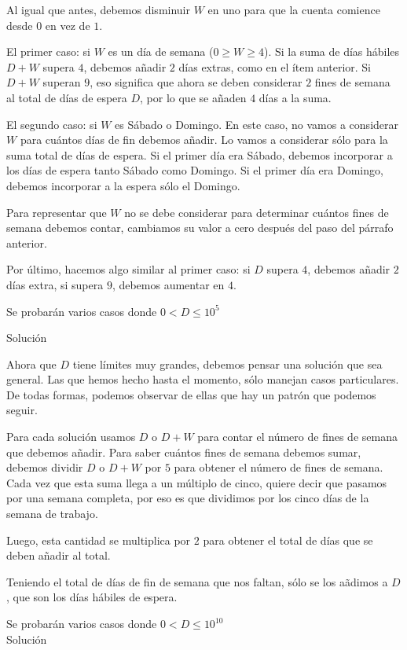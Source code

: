 \documentclass{oci}
\begin{document}
\begin{scoreDescription}
  Al igual que antes, debemos disminuir $W$ en uno para que la cuenta comience desde $0$
  en vez de $1$.

  El primer caso: si $W$ es un d\'ia de semana ($0 \geq W \geq 4$). Si la suma de
  d\'ias h\'abiles $D + W$ supera $4$, debemos a\~nadir $2$ d\'ias extras, como en el 
  \'item anterior. Si $D + W$ superan $9$, eso significa que ahora se deben considerar $2$
  fines de semana al total de d\'ias de espera $D$, por lo que se a\~naden $4$ d\'ias a
  la suma.
  
  El segundo caso: si $W$ es S\'abado o Domingo. En este caso, no vamos a considerar
  $W$ para cu\'antos d\'ias de fin debemos a\~nadir. Lo vamos a considerar s\'olo para
  la suma total de d\'ias de espera. Si el primer d\'ia era S\'abado, 
  debemos incorporar a los d\'ias de espera tanto S\'abado como Domingo. Si el primer 
  d\'ia era Domingo, debemos incorporar a la espera s\'olo el Domingo.
  
  Para representar que $W$ no se debe considerar para determinar cu\'antos fines de
  semana debemos contar, cambiamos su valor a cero despu\'es del paso del p\'arrafo
  anterior.
  
  Por \'ultimo, hacemos algo similar al primer caso: si $D$ supera $4$, debemos a\~nadir
  $2$ d\'ias extra, si supera $9$, debemos aumentar en $4$.

   Se probarán varios casos donde $0 < D \leq 10^5$

  Soluci\'on

  Ahora que $D$ tiene l\'imites muy grandes, debemos pensar una soluci\'on que sea 
  general. Las que hemos hecho hasta el momento, s\'olo manejan casos particulares.
  De todas formas, podemos observar de ellas que hay un patr\'on que podemos seguir.

  Para cada soluci\'on usamos $D$ o $D + W$ para contar el n\'umero de fines de semana
  que debemos a\~nadir. Para saber cu\'antos fines de semana debemos sumar, debemos
  dividir $D$ o $D + W$ por $5$ para obtener el n\'umero de fines de semana. Cada vez
  que esta suma llega a un m\'ultiplo de cinco, quiere decir que pasamos por una semana
  completa, por eso es que dividimos por los cinco d\'ias de la semana de trabajo.

  Luego, esta cantidad se multiplica por $2$ para obtener el total de d\'ias que se
  deben a\~nadir al total.

  Teniendo el total de d\'ias de fin de semana que nos faltan, s\'olo se los a\~adimos a
  $D$, que son los d\'ias h\'abiles de espera.

  

   Se probarán varios casos donde $0 < D \leq 10^{10}$ \\
  Soluci\'on
\end{scoreDescription}

\begin{sampleDescription}
\end{sampleDescription}
\end{document}
